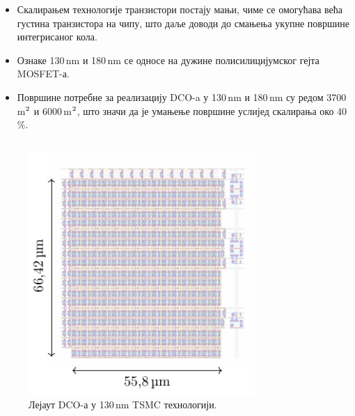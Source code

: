 \documentclass[aspectratio=169]{beamer}
\def \DCO  {DCO} %
\begin{document}
\begin{frame}{\secname}
	\begin{itemize}
		\item Скалирањем технологије транзистори постају мањи, чиме се омогућава већа густина транзистора на чипу, што даље доводи до смањења укупне површине интегрисаног кола.
		\item Ознаке 130\,nm и 180\,nm се односе на дужине полисилицијумског гејта MOSFET-а.
		\item Површине потребне за реализацију \DCO-a у 130\,nm и 180\,nm су редом 3700\,\text\textmu m$^\text2$ и 6000\,\text\textmu m$^\text2$, што значи да је умањење површине услијед скалирања око 40\,\%.
	\end{itemize}
\end{frame}

\begin{frame}{\secname}
    \begin{columns}[t]
        \begin{column}{0.4\textwidth}
            \begin{figure}[!t]
            	\centering
            	\includegraphics[scale=0.8]{slike/prezentacija/layout_dco5_hl_lh_130_2.pdf}
		\caption{Лејаут \DCO-а у 130\,nm TSMC технологији.}
            \end{figure}
		\end{column}
		\hspace{-0.8cm}
		\begin{column}{0.6\textwidth}
            \begin{figure}[!t]
            	\centering

\end{figure}
\end{column}
\end{columns}
\end{frame}
\end{document}
